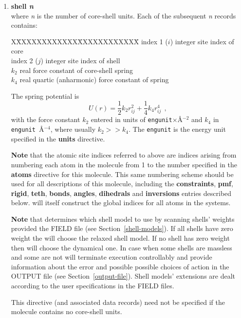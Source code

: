 \begin{enumerate}
\item{\bf shell {\em n}} \\
where {\em n} is the number of core-shell units.  Each of the
subsequent {\em n} records contains:
\begin{tabbing}
X\=XXXXXXXXXXXX\=XXXXXXXXXXXX\=\kill
\> index 1 ($i$) \> integer \> site index of core \\
\> index 2 ($j$) \> integer \> site index of shell \\
\> $k_{2}$       \> real    \> force constant of core-shell spring \\
\> $k_{4}$       \> real    \> quartic (anharmonic) force constant of spring
\end{tabbing}
The spring potential is
\begin{equation}
U(r)=\frac{1}{2}k_{2} r_{ij}^{2}+\frac{1}{4}k_{4} r_{ij}^{4}~~,
\end{equation}
with the force constant $k_{2}$ entered in units of {\tt engunit}$\times$\AA$^{-2}$
and $k_{4}$ in {\tt engunit}~\AA$^{-4}$, where usually $k_{2} >> k_{4}$.
The {\tt engunit} is the energy unit specified in the {\bf units} directive.

{\bf Note} that the atomic site indices referred to above are
indices arising from numbering each atom in the molecule from 1 to
the number specified in the {\bf atoms} directive for this
molecule.  This same numbering scheme should be used for all
descriptions of this molecule, including the {\bf constraints},
{\bf pmf}, {\bf rigid}, {\bf teth}, {\bf bonds}, {\bf angles},
{\bf dihedrals} and {\bf inversions} entries described below.
\D will itself construct the global indices for all atoms in the systems.

{\bf Note} that \D determines which shell model to use by scanning
shells' weights provided the FIELD file (see Section~\ref{shell-models}).
If all shells have zero weight the \D will choose the relaxed shell
model.  If no shell has zero weight then \D will choose the dynamical
one.  In case when some shells are massless and some are not \D will
terminate execution controllably and provide information about the
error and possible possible choices of action in the OUTPUT file
(see Section~\ref{output-file}).  Shell models' extensions are dealt
according to the user specifications in the FIELD files.

This directive (and associated data records) need not be specified if
the molecule contains no core-shell units.


\end{enumerate}
